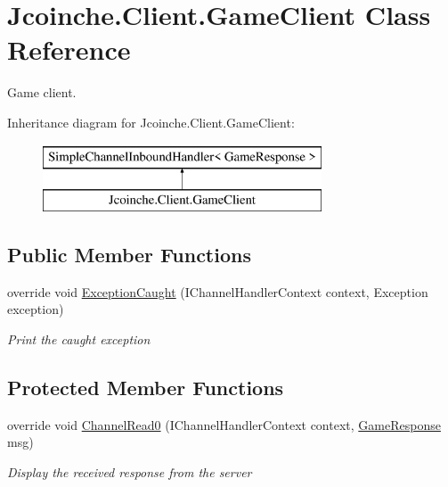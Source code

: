 \hypertarget{class_jcoinche_1_1_client_1_1_game_client}{}\section{Jcoinche.\+Client.\+Game\+Client Class Reference}
\label{class_jcoinche_1_1_client_1_1_game_client}


Game client.  


Inheritance diagram for Jcoinche.\+Client.\+Game\+Client\+:\begin{figure}[H]
\begin{center}
\leavevmode
\includegraphics[height=2.000000cm]{class_jcoinche_1_1_client_1_1_game_client}
\end{center}
\end{figure}
\subsection*{Public Member Functions}
\begin{DoxyCompactItemize}
\item 
override void \hyperlink{class_jcoinche_1_1_client_1_1_game_client_a90930ab6c2df70474d6239269613b3a9}{Exception\+Caught} (I\+Channel\+Handler\+Context context, Exception exception)
\begin{DoxyCompactList}\small\item\em Print the caught exception \end{DoxyCompactList}\end{DoxyCompactItemize}
\subsection*{Protected Member Functions}
\begin{DoxyCompactItemize}
\item 
override void \hyperlink{class_jcoinche_1_1_client_1_1_game_client_ad0255d5488f5e3b8f0be7acbb93cc27b}{Channel\+Read0} (I\+Channel\+Handler\+Context context, \hyperlink{class_jcoinche_1_1_google_1_1_protobuf_1_1_game_response}{Game\+Response} msg)
\begin{DoxyCompactList}\small\item\em Display the received response from the server \end{DoxyCompactList}\end{DoxyCompactItemize}


